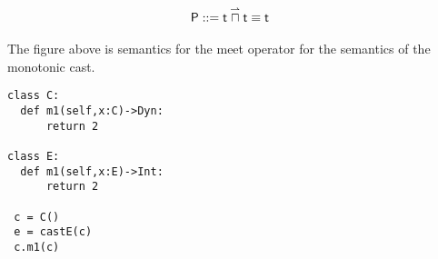 \documentclass[a4paper,UKenglish,final]{tex/lipics-v2016}
\begin{document}
\hrulefill


\begin{align*}
\P &::= \dmeet{\t}{\t} \equiv \t
\end{align*}

\begin{mathpar}






\end{mathpar}

The figure above is semantics for the meet operator for the semantics of the monotonic cast.

\begin{verbatim}
class C:
  def m1(self,x:C)->Dyn:
      return 2

class E:
  def m1(self,x:E)->Int:
      return 2

 c = C()
 e = castE(c)
 c.m1(c)
\end{verbatim}
\end{document}
